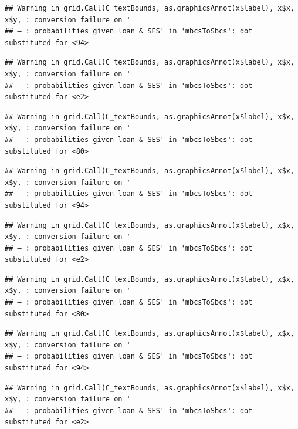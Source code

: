 \documentclass[]{article}
\begin{document}
\begin{verbatim}
## Warning in grid.Call(C_textBounds, as.graphicsAnnot(x$label), x$x, x$y, : conversion failure on '
## — : probabilities given loan & SES' in 'mbcsToSbcs': dot substituted for <94>
\end{verbatim}

\begin{verbatim}
## Warning in grid.Call(C_textBounds, as.graphicsAnnot(x$label), x$x, x$y, : conversion failure on '
## — : probabilities given loan & SES' in 'mbcsToSbcs': dot substituted for <e2>
\end{verbatim}

\begin{verbatim}
## Warning in grid.Call(C_textBounds, as.graphicsAnnot(x$label), x$x, x$y, : conversion failure on '
## — : probabilities given loan & SES' in 'mbcsToSbcs': dot substituted for <80>
\end{verbatim}

\begin{verbatim}
## Warning in grid.Call(C_textBounds, as.graphicsAnnot(x$label), x$x, x$y, : conversion failure on '
## — : probabilities given loan & SES' in 'mbcsToSbcs': dot substituted for <94>
\end{verbatim}

\begin{verbatim}
## Warning in grid.Call(C_textBounds, as.graphicsAnnot(x$label), x$x, x$y, : conversion failure on '
## — : probabilities given loan & SES' in 'mbcsToSbcs': dot substituted for <e2>
\end{verbatim}

\begin{verbatim}
## Warning in grid.Call(C_textBounds, as.graphicsAnnot(x$label), x$x, x$y, : conversion failure on '
## — : probabilities given loan & SES' in 'mbcsToSbcs': dot substituted for <80>
\end{verbatim}

\begin{verbatim}
## Warning in grid.Call(C_textBounds, as.graphicsAnnot(x$label), x$x, x$y, : conversion failure on '
## — : probabilities given loan & SES' in 'mbcsToSbcs': dot substituted for <94>
\end{verbatim}

\begin{verbatim}
## Warning in grid.Call(C_textBounds, as.graphicsAnnot(x$label), x$x, x$y, : conversion failure on '
## — : probabilities given loan & SES' in 'mbcsToSbcs': dot substituted for <e2>
\end{verbatim}
\end{document}
